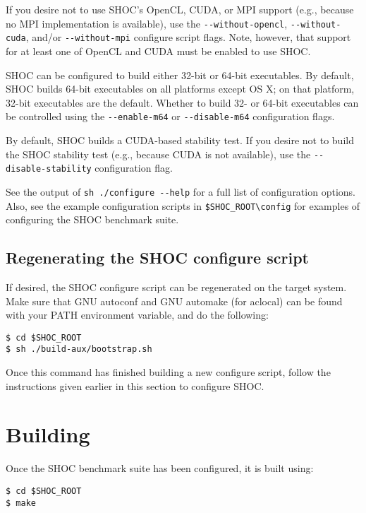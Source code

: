 \documentclass[11pt]{article}
\begin{document}
If you desire not to use SHOC's OpenCL, CUDA, or MPI support (e.g., because
no MPI implementation is available), use the \verb+--without-opencl+,
\verb+--without-cuda+,
and/or \verb+--without-mpi+ configure script flags.
Note, however, that support for at least one of OpenCL and CUDA must be
enabled to use SHOC.

SHOC can be configured to build either 32-bit or 64-bit executables.
By default, SHOC builds 64-bit executables on all platforms except OS X; on 
that platform, 32-bit executables are the default.
Whether to build 32- or 64-bit executables can be controlled using the
\verb+--enable-m64+ or \verb+--disable-m64+ configuration flags.

By default, SHOC builds a CUDA-based stability test.
If you desire not to build the SHOC stability test (e.g., because CUDA is
not available), use the \verb+--disable-stability+ configuration flag.

See the output of \verb+sh ./configure --help+ for a full list of configuration 
options.
Also, see the example configuration scripts in \verb+$SHOC_ROOT\config+ for
examples of configuring the SHOC benchmark suite.

\subsection{Regenerating the SHOC configure script}

If desired, the SHOC configure script can be regenerated on the target system.
Make sure that GNU autoconf and GNU automake (for aclocal) can be found with
your PATH environment variable, and do the following:

\begin{Verbatim}[frame=single]
$ cd $SHOC_ROOT
$ sh ./build-aux/bootstrap.sh
\end{Verbatim}

Once this command has finished building a new configure script, follow the
instructions given earlier in this section to configure SHOC.


\section{Building}\label{sec:building}

Once the SHOC benchmark suite has been configured, it is built using:

\begin{Verbatim}[frame=single]
$ cd $SHOC_ROOT
$ make
\end{Verbatim}
\end{document}
